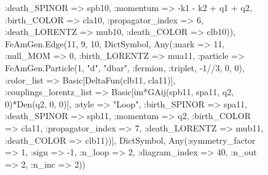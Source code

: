 \documentclass{revtex4}
\begin{document}
\begin{figure}[!htb]
\begin{center}
{:death_SPINOR => spb10, :momentum => -k1 - k2 + q1 + q2, :birth_COLOR => cla10, :propagator_index => 6, :death_LORENTZ => mub10, :death_COLOR => clb10)), FeAmGen.Edge(11, 9, 10, Dict{Symbol, Any}(:mark => 11, :null_MOM => 0, :birth_LORENTZ => mua11, :particle => FeAmGen.Particle(1, "d", "dbar", :fermion, :triplet, -1//3, 0, 0), :color_list => Basic[DeltaFun(clb11, cla11)], :couplings_lorentz_list => Basic[im*GAij(spb11, spa11, q2, 0)*Den(q2, 0, 0)], :style => "Loop", :birth_SPINOR => spa11, :death_SPINOR => spb11, :momentum => q2, :birth_COLOR => cla11, :propagator_index => 7, :death_LORENTZ => mub11, :death_COLOR => clb11))], Dict{Symbol, Any}(:symmetry_factor => 1, :sign => -1, :n_loop => 2, :diagram_index => 40, :n_out => 2, :n_inc => 2)) 
}
\end{center}
\end{figure}
\end{document}
